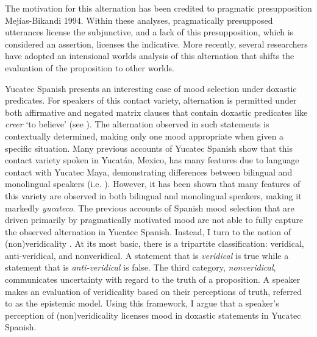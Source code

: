 \documentclass[output=paper,colorlinks,citecolor=brown,
]{langscibook}
\begin{document}
The motivation for this alternation has been credited to pragmatic presupposition \citep{Haverkate2002,Lunn1989} Mejías-Bikandi 1994. Within these analyses, pragmatically presupposed utterances license the subjunctive, and a lack of this presupposition, which is considered an assertion, licenses the indicative. More recently, several researchers \citep{Gielau2015,Quer2001,Villalta2008} have adopted an intensional worlds analysis of this alternation that shifts the evaluation of the proposition to other worlds.

Yucatec Spanish presents an interesting case of mood selection under doxastic predicates. For speakers of this contact variety, alternation is permitted under both affirmative and negated matrix clauses that contain doxastic predicates like \textit{creer }`to believe' (see \citealt{Bove2020}). The alternation observed in such statements is contextually determined, making only one mood appropriate when given a specific situation. Many previous accounts of Yucatec Spanish show that this contact variety spoken in Yucatán, Mexico, has many features due to language contact with Yucatec Maya, demonstrating differences between bilingual and monolingual speakers (i.e. \citealt{Bove2019,Bove2020,Michnowicz2011,Michnowicz2015,Solomon1999}). However, it has been shown that many features of this variety are observed in both bilingual and monolingual speakers, making it markedly \textit{yucateco}. The previous accounts of Spanish mood selection that are driven primarily by pragmatically motivated mood are not able to fully capture the observed alternation in Yucatec Spanish. Instead, I turn to the notion of (non)veridicality \citep{Giannakidou1998,Giannakidou2002,Giannakidou2006,Giannakidou2009,Giannakidou2015,GiannakidouMari2020,Mari2016}. At its most basic, there is a tripartite classification: veridical, anti-veridical, and nonveridical. A statement that is \textit{veridical }is true while a statement that is \textit{anti-veridical }is false. The third category, \textit{nonveridical}, communicates uncertainty with regard to the truth of a proposition. A speaker makes an evaluation of veridicality based on their perceptions of truth, referred to as the epistemic model. Using this framework, I argue that a speaker's perception of (non)veridicality licenses mood in doxastic statements in Yucatec Spanish. 
\end{document}

